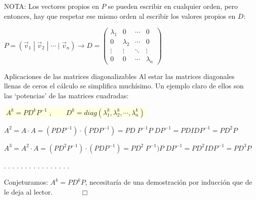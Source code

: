NOTA: Los vectores propios en $P$ se pueden escribir en cualquier orden, pero entonces, hay que respetar ese mismo orden al escribir los valores propios en $D$: 

$P=\left( \vec v_1 \; | \; \vec v_2 \; | \; \cdots \; | \; \vec v_n \right) \longrightarrow D=\left( \begin{matrix} \lambda_1 &0&\cdots &0 \\ 0&\lambda_2&\cdots & 0 \\ \vdots & \vdots & \ddots & \vdots \\ 0&0&\cdots & \lambda_n \end{matrix} \right)$

\begin{theorem}{Aplicaciones de las matrices diagonalizables}
Al estar las matrices diagonales llenas de ceros el cálculo se simplifica muchísimo. Un ejemplo claro de ellos son las `potencias' de las matrices cuadradas:

\vspace{4mm} \centerline{\colorbox{LightYellow}{$\; A^k=PD^kP^{-1} \; , \qquad D^k=diag(\lambda_1^k, \lambda_2^k, \cdots, \lambda_n^k)\; $	}}
\end{theorem}


\textcolor{gris}{\noindent $A^2=A\cdot A = (PDP^{-1})\cdot  (PDP^{-1})= PD\; P^{-1} P\; DP^{-1}=  PDIDP^{-1}=PD^2P$}

\noindent \textcolor{gris}{\noindent $A^3=A^2\cdot A= (PD^2P^{-1})\cdot (PDP^{-1})=PD^2\;P^{-1})P\; DP^{-1}=PD^2IDP^{-1}=PD^3P$}

\noindent \textcolor{gris}{\noindent . . . . . . . . . . . . . . . .}

\noindent \textcolor{gris}{\noindent Conjeturamos: $A^k=PD^kP$, necesitaría de una demostración por inducción que de le deja al lector.}$\qquad \qquad \Box$
	

	



